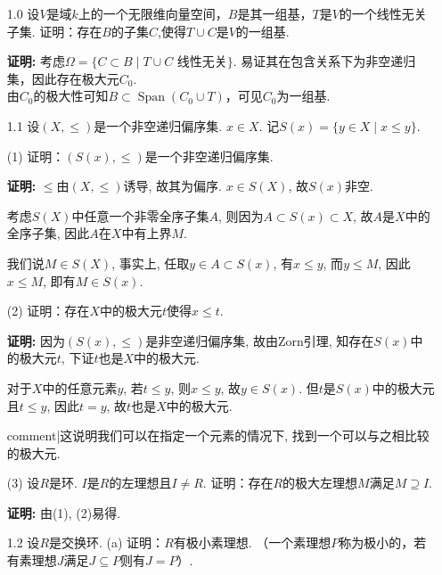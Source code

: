 \begin{enumerate}
    \item[1.0]
        设$V$是域$k$上的一个无限维向量空间，$B$是其一组基，$T$是$V$的一个线性无关子集. 
        证明：存在$B$的子集$C$,使得$T \cup C$是$V$的一组基.
    \item[\textbf{证明:}]    
        考虑$\Omega=\{C\subset B\mid T\cup C\text{ 线性无关}\}$.
        易证其在包含关系下为非空递归集，因此存在极大元$C_0$.\\
    由$C_0$的极大性可知$B\subset \operatorname{Span}(C_0\cup T)$，可见$C_0$为一组基. 

    \item[1.1]
        设$(X,\leq)$是一个非空递归偏序集. $x \in X$. 
        记$S(x)=\{y \in X \mid x \leq y\}$. 
        
    \item[(1)] 证明：$(S(x),\leq)$是一个非空递归偏序集.
    \item[\textbf{证明:}]   $\leq$由$(X,\leq)$诱导, 故其为偏序. 
        $x\in S(X)$, 故$S(x)$非空.\par
        考虑$S(X)$中任意一个非零全序子集$A$, 则因为$A\subset S(x) \subset X$, 
        故$A$是$X$中的全序子集, 因此$A$在$X$中有上界$M$.\par
        我们说$M\in S(X)$, 事实上, 任取$y\in A\subset S(x)$, 有$x\leq y$, 
        而$y\leq M$, 因此$x\leq M$, 即有$M\in S(x)$.
    
    \item[(2)] 证明：存在$X$中的极大元$t$使得$x \leq t$.
    \item[\textbf{证明:}]
        因为$(S(x),\leq)$是非空递归偏序集, 故由Zorn引理, 
        知存在$S(x)$中的极大元$t$, 下证$t$也是$X$中的极大元.\par
        对于$X$中的任意元素$y$, 若$t\leq y$, 则$x\leq y$, 故$y\in S(x)$. 
        但$t$是$S(x)$中的极大元且$t\leq y$, 因此$t=y$, 故$t$也是$X$中的极大元.

        {{comment|这说明我们可以在指定一个元素的情况下, 找到一个可以与之相比较的极大元.}}

    \item[(3)] 设$R$是环. $I$是$R$的左理想且$I \neq R$. 
        证明：存在$R$的极大左理想$M$满足$M \supseteq I$.
    \item[\textbf{证明:}]   由(1), (2)易得.
    
    \item[1.2]
    设$R$是交换环. (a) 证明：$R$有极小素理想. 
    （一个素理想$P$称为极小的，若有素理想$J$满足$J\subseteq P$则有$J=P$）.


\end{enumerate}
